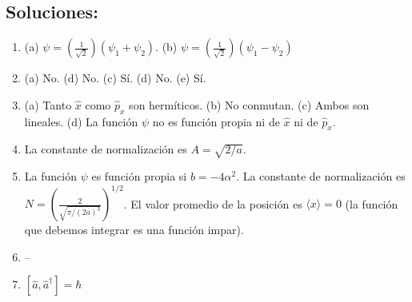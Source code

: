 \documentclass{tufte-handout}
\begin{document}
\newpage
\subsection{\textbf{Soluciones:}}
\begin{enumerate}
    \item (a) $\psi=(\frac{1}{\sqrt{2}})(\psi_1+\psi_2)$. (b) $\psi=(\frac{1}{\sqrt{2}})(\psi_1-\psi_2)$
    \item (a) No. (d) No. (c) Sí. (d) No. (e) Sí.
    \item (a) Tanto $\hat{x}$ como $\hat{p}_x$ son hermíticos. (b) No conmutan. (c) Ambos son lineales. (d) La función $\psi$ no es función propia ni de $\hat{x}$ ni de $\hat{p}_x$.
    \item La constante de normalización es $A=\sqrt{2/a}$.
    \item La función $\psi$ es función propia si $b=-4\alpha^2$. La constante de normalización es
    $N=(\frac{2}{\sqrt{\pi/(2a)^3}})^{1/2}$. El valor
    promedio de la posición es $\langle x \rangle=0$ (la función que debemos integrar es una función impar).
    \item --
    \item $[\hat{a},\hat{a}^\dagger]=\hbar$
\end{enumerate}
\end{document}
